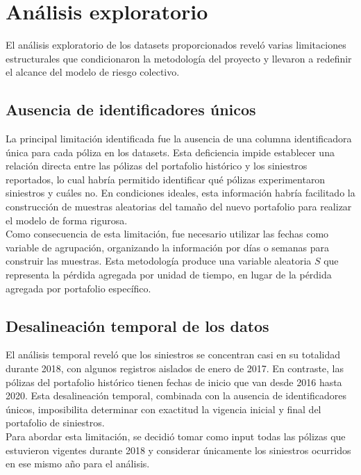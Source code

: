 \section{Análisis exploratorio}

El análisis exploratorio de los datasets proporcionados reveló varias limitaciones estructurales que condicionaron la metodología del proyecto y llevaron a redefinir el alcance del modelo de riesgo colectivo.

\subsection{Ausencia de identificadores únicos}

La principal limitación identificada fue la ausencia de una columna identificadora única para cada póliza en los datasets. Esta deficiencia impide establecer una relación directa entre las pólizas del portafolio histórico y los siniestros reportados, lo cual habría permitido identificar qué pólizas experimentaron siniestros y cuáles no. En condiciones ideales, esta información habría facilitado la construcción de muestras aleatorias del tamaño del nuevo portafolio para realizar el modelo de forma rigurosa.\\

Como consecuencia de esta limitación, fue necesario utilizar las fechas como variable de agrupación, organizando la información por días o semanas para construir las muestras. Esta metodología produce una variable aleatoria $S$ que representa la pérdida agregada por unidad de tiempo, en lugar de la pérdida agregada por portafolio específico.

\subsection{Desalineación temporal de los datos}

El análisis temporal reveló que los siniestros se concentran casi en su totalidad durante 2018, con algunos registros aislados de enero de 2017. En contraste, las pólizas del portafolio histórico tienen fechas de inicio que van desde 2016 hasta 2020. Esta desalineación temporal, combinada con la ausencia de identificadores únicos, imposibilita determinar con exactitud la vigencia inicial y final del portafolio de siniestros.\\

Para abordar esta limitación, se decidió tomar como input todas las pólizas que estuvieron vigentes durante 2018 y considerar únicamente los siniestros ocurridos en ese mismo año para el análisis.

